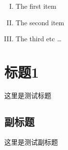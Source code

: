 \documentclass{article}
\begin{document}
\renewcommand\thesection{\Roman{section}}
\renewcommand\thesubsection{\thesection.\arabic{subsection}}



\begin{enumerate}[(I)]
\item The first item
\item The second item
\item The third etc \ldots
\end{enumerate}


\section{标题1}
这里是测试标题
\subsection{副标题}
这里是测试副标题
\end{document}
